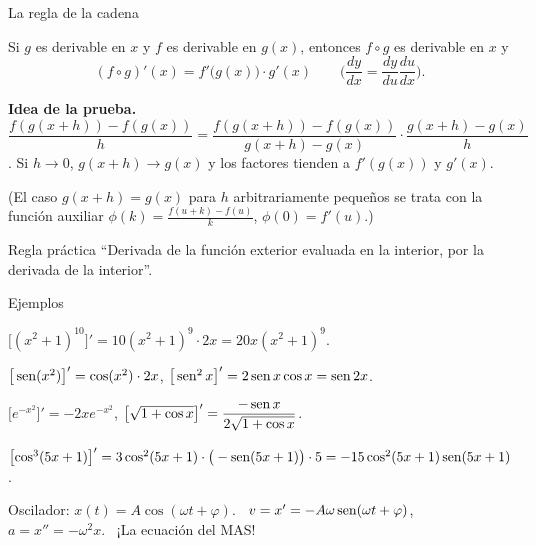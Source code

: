 \documentclass[10pt,aspectratio=169]{beamer}
\begin{document}
\begin{frame}{La regla de la cadena}
  \begin{teorema}
    Si $g$ es derivable en $x$ y $f$ es derivable en $g(x)$, entonces $f\circ g$ es derivable en $x$ y
    \[ (f\circ g)'(x)=f'\big(g(x)\big)\cdot g'(x)\qquad\Big(\frac{dy}{dx}=\frac{dy}{du}\frac{du}{dx}\Big). \]
  \end{teorema}
  \textbf{Idea de la prueba.} $\dfrac{f(g(x+h))-f(g(x))}{h}=\dfrac{f(g(x+h))-f(g(x))}{g(x+h)-g(x)}\cdot\dfrac{g(x+h)-g(x)}{h}$.
  Si $h\to0$, $g(x+h)\to g(x)$ y los factores tienden a $f'(g(x))$ y $g'(x)$.
  \smallskip

  \small (El caso $g(x+h)=g(x)$ para $h$ arbitrariamente pequeños se trata con la función auxiliar $\phi(k)=\frac{f(u+k)-f(u)}{k}$, $\phi(0)=f'(u)$.)
  \normalsize
  \begin{block}{Regla práctica}
    ``Derivada de la función exterior evaluada en la interior, por la derivada de la interior''.
  \end{block}
\end{frame}

\begin{frame}{Ejemplos}
  \small
  \begin{ejemplo}[1]
    $\big[(x^2+1)^{10}\big]'=10(x^2+1)^9\cdot2x=20x(x^2+1)^9$.
  \end{ejemplo}
  \begin{ejemplo}[2]
    $\big[\operatorname{sen}(x^2)\big]'=\cos(x^2)\cdot2x$, \qquad $\big[\operatorname{sen}^2x\big]'=2\operatorname{sen} x\cos x=\operatorname{sen}2x$.
  \end{ejemplo}
  \begin{ejemplo}[3]
    $\big[e^{-x^2}\big]'=-2xe^{-x^2}$, \qquad $\left[\sqrt{1+\cos x}\right]'=\dfrac{-\operatorname{sen} x}{2\sqrt{1+\cos x}}$.
  \end{ejemplo}
  \begin{ejemplo}
    $\left[\cos^3(5x+1)\right]'=3\cos^2(5x+1)\cdot\big(-\operatorname{sen}(5x+1)\big)\cdot5=-15\cos^2(5x+1)\operatorname{sen}(5x+1)$.
  \end{ejemplo}
  \begin{ejemplo}[5: física]
    Oscilador: $x(t)=A\cos(\omega t+\varphi)$. \ $v=x'=-A\omega\operatorname{sen}(\omega t+\varphi)$, \ $a=x''=-\omega^2x$. \ ¡La ecuación del MAS!
  \end{ejemplo}
\end{frame}
\end{document}
